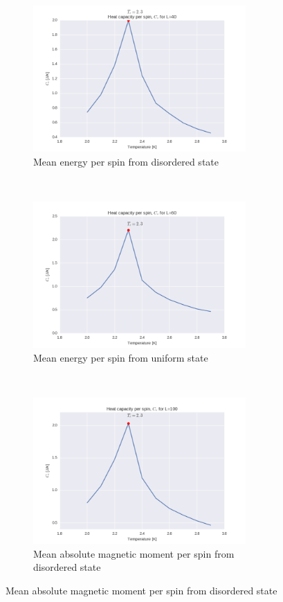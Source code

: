 \documentclass[a4paper, 10pt]{article}
\begin{document}
\begin{figure}[!ht]
    \centering
    \begin{subfigure}[H!]{0.5\textwidth}
        \centering
        \includegraphics[height=2.2in]{cvl40Ne5.png}
        \caption{Mean energy per spin from disordered state}
    \end{subfigure}%
    ~ 
    \begin{subfigure}[H!]{0.5\textwidth}
        \centering
        \includegraphics[height=2.2in]{cvl60Ne5.png}
        \caption{Mean energy per spin from uniform state}
    \end{subfigure}
        ~
     \begin{subfigure}[H!]{0.5\textwidth}
        \centering
        \includegraphics[height=2.2in]{cvl100Ne5.png}
        \caption{Mean absolute magnetic moment per spin from disordered state}
    \end{subfigure}%

\end{figure}
\end{document}
